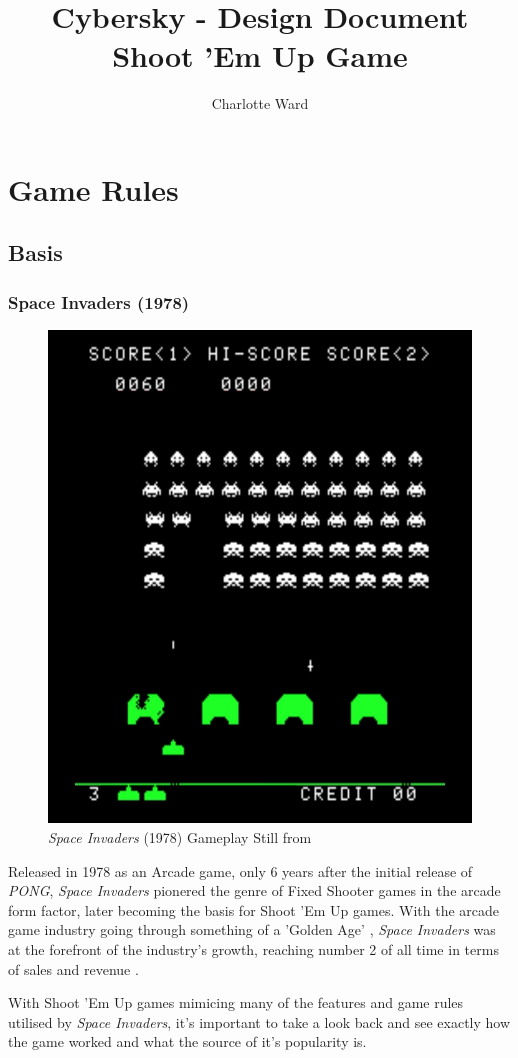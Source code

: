 \documentclass{scrartcl}
\let\cite\textcite
\let\citep\autocite
\begin{document}
\author{Charlotte Ward}
\title{ {\huge Cybersky - Design Document} \\ {\small Shoot 'Em Up Game} }
\maketitle

\section{Game Rules}

\subsection{Basis}

\subsubsection{Space Invaders (1978)}

\begin{figure}[ht]
  \centering
  \includegraphics[width=.35\columnwidth]{SpaceInvaders.png}
  \caption[\textit{Space Invaders}]{\textit{Space Invaders} (1978) Gameplay Still from \cite{Youtube001}}
\end{figure}

Released in 1978 as an Arcade game, only 6 years after the initial release of \textit{PONG}, \textit{Space Invaders} pionered the genre of Fixed Shooter games in the arcade form factor, later becoming the basis for Shoot 'Em Up games. With the arcade game industry going through something of a 'Golden Age' \citep{BMIGaming001}, \textit{Space Invaders} was at the forefront of the industry's growth, reaching number 2 of all time in terms of sales and revenue \citep{USGamer001}.

With Shoot 'Em Up games mimicing many of the features and game rules utilised by \textit{Space Invaders}, it's important to take a look back and see exactly how the game worked and what the source of it's popularity is.
\end{document}

